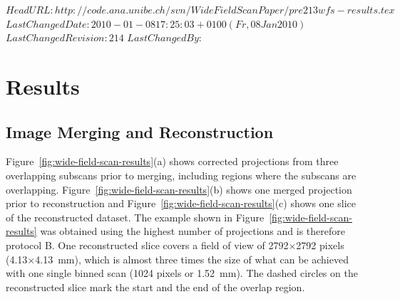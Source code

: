 \svnidlong
{$HeadURL: http://code.ana.unibe.ch/svn/WideFieldScanPaper/pre213wfs-results.tex $}
{$LastChangedDate: 2010-01-08 17:25:03 +0100 (Fr, 08 Jan 2010) $}
{$LastChangedRevision: 214 $}
{$LastChangedBy: $}
%
\section{Results}\label{sec:Results}
\subsection{Image Merging and Reconstruction}\label{sec:Image Merging and Reconstruction}
Figure~\ref{fig:wide-field-scan-results}(a) shows corrected projections from three overlapping subscans prior to merging, including regions where the subscans are overlapping. Figure~\ref{fig:wide-field-scan-results}(b) shows one merged projection prior to reconstruction and Figure~\ref{fig:wide-field-scan-results}(c) shows one slice of the reconstructed dataset. The example shown in Figure~\ref{fig:wide-field-scan-results} was obtained using the highest number of projections and is therefore protocol B. One reconstructed slice covers a field of view of 2792$\times$2792 pixels (4.13$\times$\SI{4.13}{\milli\meter}), which is almost three times the size of what can be achieved with one single binned scan (1024 pixels or \SI{1.52}{\milli\meter}). %
The dashed circles on the reconstructed slice mark the start and the end of the overlap region.

